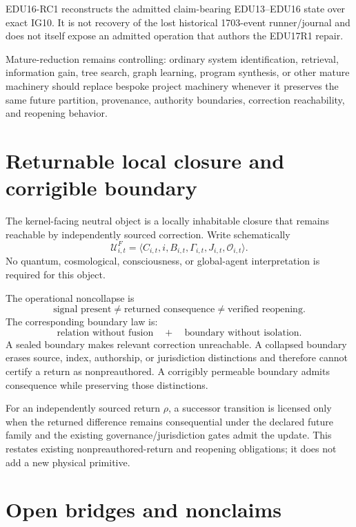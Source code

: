 \documentclass[10pt]{article}
\theoremstyle{venus}
\theoremstyle{definition}
\begin{document}
EDU16-RC1 reconstructs the admitted claim-bearing EDU13--EDU16 state over exact
IG10. It is not recovery of the lost historical 1703-event runner/journal and
does not itself expose an admitted operation that authors the EDU17R1 repair.

Mature-reduction remains controlling: ordinary system identification, retrieval,
information gain, tree search, graph learning, program synthesis, or other mature
machinery should replace bespoke project machinery whenever it preserves the same
future partition, provenance, authority boundaries, correction reachability, and
reopening behavior.


\section{Returnable local closure and corrigible boundary}

The kernel-facing neutral object is a locally inhabitable closure that remains
reachable by independently sourced correction.  Write schematically
\[
\mathcal U_{i,t}^{F}
=
\langle C_{i,t},i,B_{i,t},\Gamma_{i,t},J_{i,t},\mathcal O_{i,t}\rangle.
\]
No quantum, cosmological, consciousness, or global-agent interpretation is
required for this object.

The operational noncollapse is
\[
\boxed{
\text{signal present}
\neq
\text{returned consequence}
\neq
\text{verified reopening}.
}
\]
The corresponding boundary law is:
\[
\boxed{
\text{relation without fusion}
\quad+\quad
\text{boundary without isolation}.
}
\]
A sealed boundary makes relevant correction unreachable.  A collapsed boundary
erases source, index, authorship, or jurisdiction distinctions and therefore
cannot certify a return as nonpreauthored.  A corrigibly permeable boundary
admits consequence while preserving those distinctions.

For an independently sourced return \(\rho\), a successor transition is licensed
only when the returned difference remains consequential under the declared
future family and the existing governance/jurisdiction gates admit the update.
This restates existing nonpreauthored-return and reopening obligations; it does
not add a new physical primitive.

\section{Open bridges and nonclaims}
\end{document}
